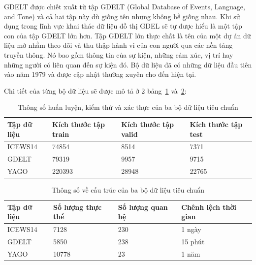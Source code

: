  GDELT được chiết xuất từ tập GDELT (Global Database of Events, Language, and Tone) và cả hai tập này dù giống tên nhưng không hề giống nhau. Khi sử dụng trong lĩnh vực khai thác dữ liệu đồ thị GDEL sẽ tự được hiểu là một tập con của tập GDELT lớn hơn. Tập GDELT lớn thực chất là tên của một dự án dữ liệu mở nhằm theo dõi và thu thập hành vi của con người qua các nền tảng truyền thông. Nó bao gồm thông tin của sự kiện, những cảm xúc, vị trí hay những người có liên quan đến sự kiện đó. Bộ dữ liệu đã có những dữ liệu đầu tiên vào năm 1979 và được cập nhật thường xuyên cho đến hiện tại.

 Chi tiết của từng bộ dữ liệu sẽ được mô tả ở 2 bảng~\ref{tab:table51} và~\ref{tab:table52}:

\begin{table}[H]
\caption{Thông số huấn luyện, kiểm thử và xác thực của ba bộ dữ liệu
 tiêu chuẩn}
\label{tab:table51}
\begin{adjustbox}{width=\textwidth}
\begin{tabular}{|l|l|l|l|}
\hline
Tập dữ  liệu & Kích thước tập train & Kích thước tập valid & Kích thước tập test \\ \hline
ICEWS14      & 74854                & 8514                 & 7371                \\ \hline
GDELT        & 79319                & 9957                 & 9715                \\ \hline
YAGO         & 220393               & 28948                & 22765               \\ \hline
\end{tabular}
\end{adjustbox} 
\end{table}

\begin{table}[H]
\caption{Thông số về cấu trúc của ba bộ dữ liệu tiêu chuẩn}
\label{tab:table52}
\begin{adjustbox}{width=\textwidth}
\begin{tabular}{|l|l|l|l|}
\hline
Tập dữ  liệu & Số lượng thực thể & Số lượng quan hệ & Chênh lệch thời gian \\ \hline
ICEWS14      & 7128              & 230              & 1 ngày               \\ \hline
GDELT        & 5850              & 238              & 15 phút              \\ \hline
YAGO         & 10778             & 23               & 1 năm                \\ \hline
\end{tabular}
\end{adjustbox} 
\end{table}

